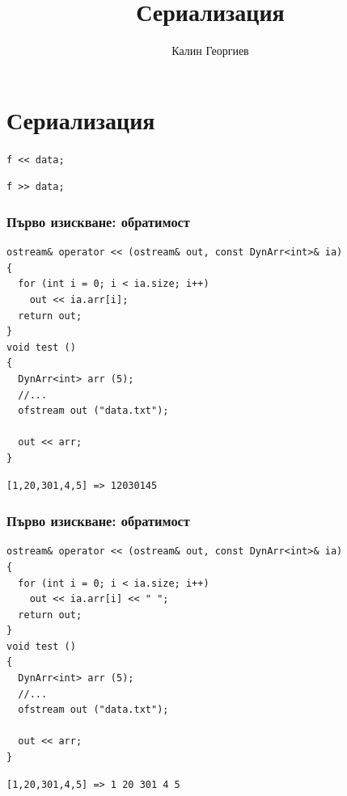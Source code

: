 \documentclass{beamer}
\begin{document}
\title[Обектно ориентирано програмиране]{Сериализация} 
\author{Калин Георгиев} 
\frame{\titlepage} 

\section{Сериализация} 

\begin{frame}
\centerline{\texttt{f << data;}}
\centerline{\texttt{f >> data;}}
\end{frame}




\begin{frame}[fragile]
\frametitle{Първо изискване: обратимост}

\begin{flushleft}
\begin{lstlisting}
ostream& operator << (ostream& out, const DynArr<int>& ia)
{
  for (int i = 0; i < ia.size; i++)
    out << ia.arr[i];
  return out;
}
void test ()
{
  DynArr<int> arr (5);
  //...
  ofstream out ("data.txt");

  out << arr;
}
\end{lstlisting}  
\end{flushleft}

\begin{lstlisting}
[1,20,301,4,5] => 12030145
\end{lstlisting}  

\end{frame}


\begin{frame}[fragile]
\frametitle{Първо изискване: обратимост}

\begin{flushleft}
\begin{lstlisting}
ostream& operator << (ostream& out, const DynArr<int>& ia)
{
  for (int i = 0; i < ia.size; i++)
    out << ia.arr[i] << " ";
  return out;
}
void test ()
{
  DynArr<int> arr (5);
  //...
  ofstream out ("data.txt");

  out << arr;
}
\end{lstlisting}  
\end{flushleft}

\begin{lstlisting}
[1,20,301,4,5] => 1 20 301 4 5
\end{lstlisting}  

\end{frame}
\end{document}
